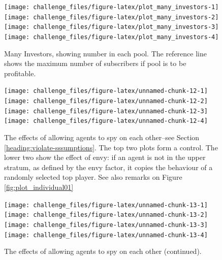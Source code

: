 \documentclass[]{article}
\begin{document}
\begin{figure}[p]

{\centering \texttt{[image: challenge\_files/figure-latex/plot\_many\_investors-1]} \texttt{[image: challenge\_files/figure-latex/plot\_many\_investors-2]} \texttt{[image: challenge\_files/figure-latex/plot\_many\_investors-3]} \texttt{[image: challenge\_files/figure-latex/plot\_many\_investors-4]} 

}

\caption{\label{fig:many_investors}Many Investors, showing number in each pool. The reference line shows the maximum number of subscribers if pool is to be profitable.}\label{fig:plot_many_investors}
\end{figure}

\begin{figure}[p]

{\centering \texttt{[image: challenge\_files/figure-latex/unnamed-chunk-12-1]} \texttt{[image: challenge\_files/figure-latex/unnamed-chunk-12-2]} \texttt{[image: challenge\_files/figure-latex/unnamed-chunk-12-3]} \texttt{[image: challenge\_files/figure-latex/unnamed-chunk-12-4]} 

}

\caption{\label{fig:plot_individual_envy01}The effects of allowing agents to spy on each other--see Section \ref{heading:violate-sssumptions}. The top two plots form a control. The lower two show the effect of envy: if an agent is not in the upper stratum, as defined by the envy factor, it copies the behaviour of a randomly selected top player. See also remarks on Figure \ref{fig:plot_individual01}}\label{fig:unnamed-chunk-12}
\end{figure}

\begin{figure}[p]

{\centering \texttt{[image: challenge\_files/figure-latex/unnamed-chunk-13-1]} \texttt{[image: challenge\_files/figure-latex/unnamed-chunk-13-2]} \texttt{[image: challenge\_files/figure-latex/unnamed-chunk-13-3]} \texttt{[image: challenge\_files/figure-latex/unnamed-chunk-13-4]} 

}

\caption{\label{fig:plot_individual_envy23}The effects of allowing agents to spy on each other (continued).}\label{fig:unnamed-chunk-13}
\end{figure}
\end{document}
